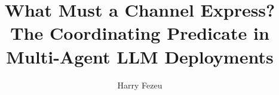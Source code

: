 \documentclass[runningheads]{llncs}          %
\begin{document}
\title{What Must a Channel Express?\\
The Coordinating Predicate in Multi-Agent LLM Deployments}

\author{Harry Fezeu}
\institute{}

\maketitle

























\end{document}
